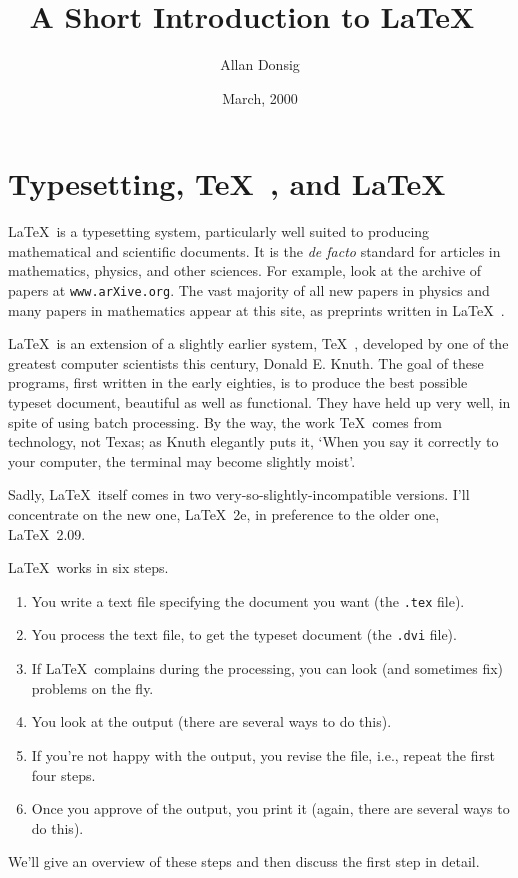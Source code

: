 \documentclass[12pt]{article}
\newcommand{\latex}{\LaTeX\ }
\newcommand{\tex}{\TeX\ }
\begin{document}
\title{A Short Introduction to \latex}
\author{Allan Donsig}
\date{March, 2000}
\maketitle

\section{Typesetting, \tex, and \latex} 

\latex is a typesetting system, particularly well suited to 
producing mathematical and scientific documents.
It is the \textit{de facto} standard for articles in mathematics, 
physics, and other sciences.
For example, look at the archive of papers at \texttt{www.arXive.org}.
The vast majority of all new papers in physics and many papers in
mathematics appear at this site, as preprints written in \latex.

\latex is an extension of a slightly earlier system, \tex, developed
by one of the greatest computer scientists this century, Donald E. Knuth.
The goal of these programs, first written in the early eighties, is to 
produce the best possible typeset document, beautiful as well as functional.
They have held up very well, in spite of using batch processing.
By the way, the work \tex comes from technology, not Texas; as Knuth 
elegantly puts it, `When you say it correctly to your computer, the terminal 
may become slightly moist'.

Sadly, \latex itself comes in two very-so-slightly-incompatible versions.
I'll concentrate on the new one, \latex2e, in preference to the older
one, \latex 2.09.

\latex works in six steps.
\begin{enumerate}
\item You write a text file specifying the document you want 
	(the \texttt{.tex} file).
\item You process the text file, to get the typeset document
	(the \texttt{.dvi} file).
\item If \latex complains during the processing, you can look
	(and sometimes fix) problems on the fly.
\item You look at the output (there are several ways to do this).
\item If you're not happy with the output, you revise the file,
	i.e., repeat the first four steps.
\item Once you approve of the output, you print it (again, there
	are several ways to do this).
\end{enumerate}
We'll give an overview of these steps and then discuss the first 
step in detail.
\end{document}
